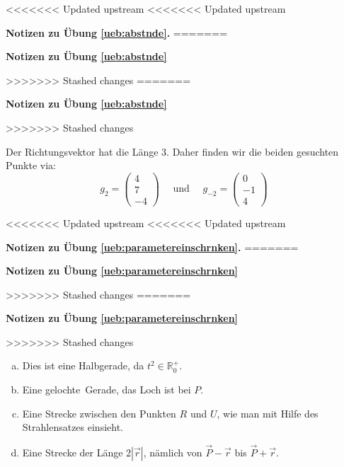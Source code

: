 \documentclass[%
11pt,%
twoside,%
titlepage,%
<<<<<<< Updated upstream
<<<<<<< Updated upstream
german,%
=======
swissgerman,%
>>>>>>> Stashed changes
=======
swissgerman,%
>>>>>>> Stashed changes
headsepline%
]{scrartcl}
\newcommand{\faReturnGray}{\textcolor{gray}{\faMailReply}} %
\newcommand{\faReturnGray}{\textcolor{gray}{\faMailReply}} %
\theoremstyle{definition}
\theoremstyle{plain}
\newcommand{\concatueb}[1]{ueb:#1}%
\newcommand{\concatlsg}[1]{lsg:#1}%
\newenvironment{lsg}[1]{%
<<<<<<< Updated upstream
<<<<<<< Updated upstream
    \par\noindent\textbf{Notizen zu Übung \ref{\concatueb{#1}}.}%
    \label{\concatlsg{#1}}
=======
    \par\noindent\textbf{Notizen zu Übung \ref{\concatueb{#1}}}\label{\concatlsg{#1}}
    \hfill\hyperref[\concatueb{#1}]{\faReturnGray}\par %
>>>>>>> Stashed changes
=======
    \par\noindent\textbf{Notizen zu Übung \ref{\concatueb{#1}}}\label{\concatlsg{#1}}
    \hfill\hyperref[\concatueb{#1}]{\faReturnGray}\par %
>>>>>>> Stashed changes
}{%
    \par%
}
\begin{document}
\begin{lsg}{abstnde}
Der Richtungsvektor hat die Länge $3$. Daher finden wir die beiden gesuchten Punkte via:
$$g_2=\begin{pmatrix}4\\7\\-4\end{pmatrix}\quad\text{ und }\quad g_{-2}=\begin{pmatrix}0\\-1\\4\end{pmatrix}$$
\end{lsg}
\begin{lsg}{parametereinschrnken}
\begin{enumerate}[a)]
    \item Dies ist eine Halbgerade, da $t^2\in\mathbb{R}^+_0$.
    \item Eine \glqq gelochte\grqq\ Gerade, das Loch ist bei $P$.
    \item Eine Strecke zwischen den Punkten $R$ und $U$, wie man mit Hilfe des Strahlensatzes einsieht.
    \item Eine Strecke der Länge $2|\vec{r}|$, nämlich von $\vec{P}-\vec{r}$ bis $\vec{P}+\vec{r}$.
\end{enumerate}
\end{lsg}
\end{document}
